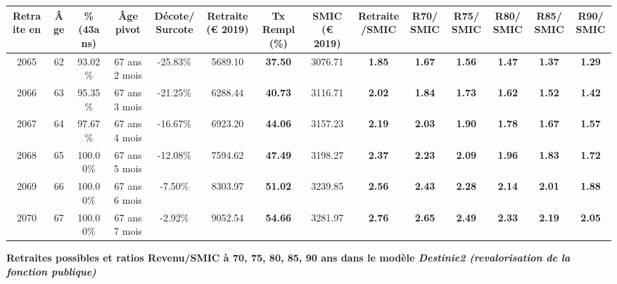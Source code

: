 \begin{adjustbox}{max width=\textwidth} 
\begin{tabular}[htb]{|c|c||c|c|c||c|c||c|c||c|c|c|c|c|} 
\hline 
 Retraite en &  Âge &  \%(43ans) &  Âge pivot &  Décote/Surcote &  Retraite (\euro{} 2019) &  Tx Rempl(\%) &  SMIC (\euro{} 2019) &  Retraite/SMIC &  R70/SMIC &  R75/SMIC &  R80/SMIC &  R85/SMIC &  R90/SMIC \\ 
\hline \hline 
 2065 &  62 &  93.02\% &  67 ans 2 mois &  -25.83\% &  5689.10 &  {\bf 37.50} &  3076.71 &  {\bf 1.85} &  {\bf 1.67} &  {\bf 1.56} &  {\bf 1.47} &  {\bf 1.37} &  {\bf 1.29} \\ 
\hline 
 2066 &  63 &  95.35\% &  67 ans 3 mois &  -21.25\% &  6288.44 &  {\bf 40.73} &  3116.71 &  {\bf 2.02} &  {\bf 1.84} &  {\bf 1.73} &  {\bf 1.62} &  {\bf 1.52} &  {\bf 1.42} \\ 
\hline 
 2067 &  64 &  97.67\% &  67 ans 4 mois &  -16.67\% &  6923.20 &  {\bf 44.06} &  3157.23 &  {\bf 2.19} &  {\bf 2.03} &  {\bf 1.90} &  {\bf 1.78} &  {\bf 1.67} &  {\bf 1.57} \\ 
\hline 
 2068 &  65 &  100.00\% &  67 ans 5 mois &  -12.08\% &  7594.62 &  {\bf 47.49} &  3198.27 &  {\bf 2.37} &  {\bf 2.23} &  {\bf 2.09} &  {\bf 1.96} &  {\bf 1.83} &  {\bf 1.72} \\ 
\hline 
 2069 &  66 &  100.00\% &  67 ans 6 mois &  -7.50\% &  8303.97 &  {\bf 51.02} &  3239.85 &  {\bf 2.56} &  {\bf 2.43} &  {\bf 2.28} &  {\bf 2.14} &  {\bf 2.01} &  {\bf 1.88} \\ 
\hline 
 2070 &  67 &  100.00\% &  67 ans 7 mois &  -2.92\% &  9052.54 &  {\bf 54.66} &  3281.97 &  {\bf 2.76} &  {\bf 2.65} &  {\bf 2.49} &  {\bf 2.33} &  {\bf 2.19} &  {\bf 2.05} \\ 
\hline 
\hline 
\end{tabular} 
\end{adjustbox} 
 
 \vspace{0.1cm} 
{\bf \noindent Retraites possibles et ratios Revenu/SMIC à 70, 75, 80, 85, 90 ans dans le modèle \emph{Destinie2 (revalorisation de la fonction publique)}}  
 
